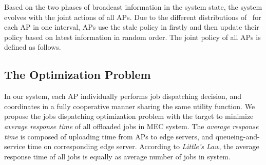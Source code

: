 Based on the two phases of broadcast information in the system state, the system evolves with the joint actions of all APs.
Due to the different distributions of \brlatency~for each AP in one interval, APs use the stale policy in firstly and then update their policy based on latest information in random order.
The joint policy of all APs is defined as follows.

\subsection{The Optimization Problem}
In our system, each AP individually performs job dispatching decision, and coordinates in a fully cooperative manner sharing the same utility function.
We propose the jobs dispatching optimization problem with the target to minimize \emph{average response time} of all offloaded jobs in MEC system.
The \emph{average response time} is composed of uploading time from APs to edge servers, and queueing-and-service time on corresponding edge server. According to \emph{Little's Law}, the average response time of all jobs is equally as average number of jobs in system.

